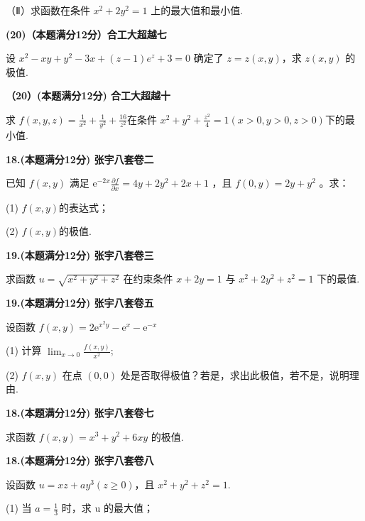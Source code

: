 \documentclass[a4paper,12pt]{article}
\begin{document}
（Ⅱ）求函数在条件 $x^{2}+2y^{2}=1$ 上的最大值和最小值.

\vspace{0.5cm}

\textbf{(20)（本题满分12分）合工大超越七}

设 $x^{2}-xy+y^{2}-3x+(z-1)e^{z}+3=0$ 确定了 $z=z(x,y)$，求 $z(x,y)$ 的极值.

\vspace{0.5cm}

\textbf{（20）(本题满分12分) 合工大超越十}

求 $f(x,y,z)=\frac{1}{x^{2}}+\frac{1}{y^{2}}+\frac{16}{z^{2}}$在条件 $x^{2}+y^{2}+\frac{z^{2}}{4}=1(x>0,y>0,z>0)$下的最小值.

\vspace{0.5cm}

\textbf{18.(本题满分12分) 张宇八套卷二}

已知 $f(x,y)$ 满足 $\mathrm{e}^{-2x}\frac{\partial f}{\partial x}=4y+2y^{2}+2x+1$ ，且 $f(0,y)=2y+y^{2}$ 。求：

(1) $f(x,y)$的表达式；

(2) $f(x,y)$的极值.

\vspace{0.5cm}

\textbf{19.(本题满分12分) 张宇八套卷三}

求函数 $u = \sqrt{x^{2} + y^{2} + z^{2}}$ 在约束条件 $x + 2y = 1$ 与 $x^{2} + 2y^{2} + z^{2} = 1$ 下的最值.

\vspace{0.5cm}

\textbf{19.(本题满分12分) 张宇八套卷五}

设函数 $f(x,y)=2\mathrm{e}^{x^{2}y}-\mathrm{e}^{x}-\mathrm{e}^{-x}$

(1) 计算 $\lim_{x\to0}\frac{f(x,y)}{x^{2}}$;

(2) $f(x,y)$ 在点 $(0,0)$ 处是否取得极值？若是，求出此极值，若不是，说明理由.

\vspace{0.5cm}

\textbf{18.(本题满分12分) 张宇八套卷七}

求函数 $f(x,y)=x^{3}+y^{2}+6xy$ 的极值.

\vspace{0.5cm}

\textbf{18.(本题满分12分) 张宇八套卷八}

设函数 $u = xz + ay^{3} (z \geqslant 0)$，且 $x^{2} + y^{2} + z^{2} = 1$.

(1) 当 $a = \frac{1}{3}$ 时，求 u 的最大值；
\end{document}
